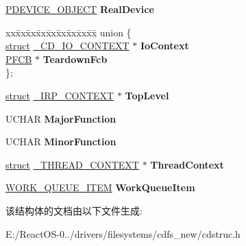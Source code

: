\begin{DoxyCompactItemize}
\hyperlink{struct___d_e_v_i_c_e___o_b_j_e_c_t}{P\+D\+E\+V\+I\+C\+E\+\_\+\+O\+B\+J\+E\+CT} {\bfseries Real\+Device}
\item 
\mbox{\label{struct___i_r_p___c_o_n_t_e_x_t_a1a76b237e9b5758f6b6ca6f1485ebe61}} 
\begin{tabbing}
xx\=xx\=xx\=xx\=xx\=xx\=xx\=xx\=xx\=\kill
union \{\\
\>\hyperlink{interfacestruct}{struct} \hyperlink{struct___c_d___i_o___c_o_n_t_e_x_t}{\_CD\_IO\_CONTEXT} $\ast$ {\bfseries IoContext}\\
\>\hyperlink{struct___f_c_b}{PFCB} $\ast$ {\bfseries TeardownFcb}\\
\}; \\

\end{tabbing}\item 
\mbox{\label{struct___i_r_p___c_o_n_t_e_x_t_a79ad69f050e0c3c448d6c3840d39f900}} 
\hyperlink{interfacestruct}{struct} \hyperlink{struct___i_r_p___c_o_n_t_e_x_t}{\+\_\+\+I\+R\+P\+\_\+\+C\+O\+N\+T\+E\+XT} $\ast$ {\bfseries Top\+Level}
\item 
\mbox{\label{struct___i_r_p___c_o_n_t_e_x_t_a28c829a5dd3c00e59e1e232603789342}} 
U\+C\+H\+AR {\bfseries Major\+Function}
\item 
\mbox{\label{struct___i_r_p___c_o_n_t_e_x_t_a787abf86ededd0494b9911fb289f8ddb}} 
U\+C\+H\+AR {\bfseries Minor\+Function}
\item 
\mbox{\label{struct___i_r_p___c_o_n_t_e_x_t_ab3727b922a4d2c56dfe1002fbd734e6c}} 
\hyperlink{interfacestruct}{struct} \hyperlink{struct___t_h_r_e_a_d___c_o_n_t_e_x_t}{\+\_\+\+T\+H\+R\+E\+A\+D\+\_\+\+C\+O\+N\+T\+E\+XT} $\ast$ {\bfseries Thread\+Context}
\item 
\mbox{\label{struct___i_r_p___c_o_n_t_e_x_t_af7cf2ecb57a60e24fdad0f6b26d1ae47}} 
\hyperlink{struct___w_o_r_k___q_u_e_u_e___i_t_e_m}{W\+O\+R\+K\+\_\+\+Q\+U\+E\+U\+E\+\_\+\+I\+T\+EM} {\bfseries Work\+Queue\+Item}
\end{DoxyCompactItemize}


该结构体的文档由以下文件生成\+:\begin{DoxyCompactItemize}
\item 
E\+:/\+React\+O\+S-\/0../drivers/filesystems/cdfs\+\_\+new/cdstruc.\+h\end{DoxyCompactItemize}

